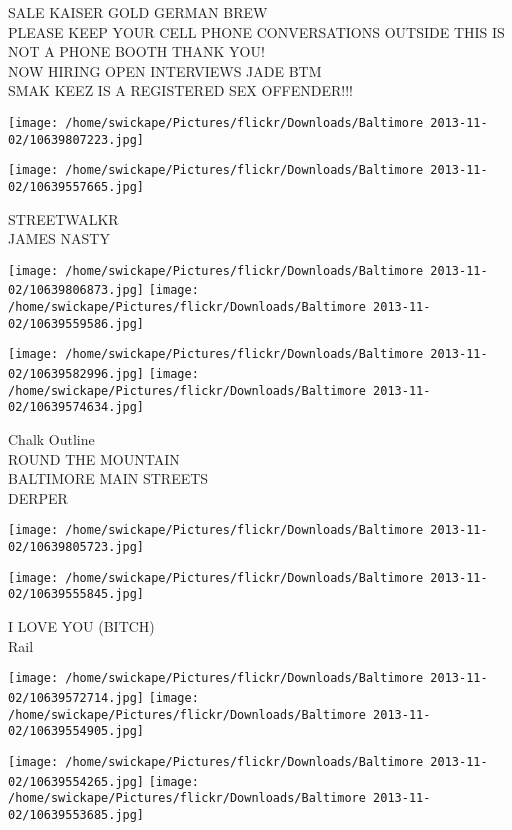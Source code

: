 \documentclass[10pt,letterpaper]{article}
\begin{document}
SALE KAISER GOLD GERMAN BREW\\
PLEASE KEEP YOUR CELL PHONE CONVERSATIONS OUTSIDE THIS IS NOT A PHONE BOOTH THANK YOU!\\
NOW HIRING OPEN INTERVIEWS JADE BTM\\
SMAK KEEZ IS A REGISTERED SEX OFFENDER!!!\\
\pagebreak

\texttt{[image: /home/swickape/Pictures/flickr/Downloads/Baltimore 2013-11-02/10639807223.jpg]}

\vspace{0.25in}
\texttt{[image: /home/swickape/Pictures/flickr/Downloads/Baltimore 2013-11-02/10639557665.jpg]}

STREETWALKR\\
JAMES NASTY\\
\pagebreak

\texttt{[image: /home/swickape/Pictures/flickr/Downloads/Baltimore 2013-11-02/10639806873.jpg]}
\texttt{[image: /home/swickape/Pictures/flickr/Downloads/Baltimore 2013-11-02/10639559586.jpg]}

\texttt{[image: /home/swickape/Pictures/flickr/Downloads/Baltimore 2013-11-02/10639582996.jpg]}
\texttt{[image: /home/swickape/Pictures/flickr/Downloads/Baltimore 2013-11-02/10639574634.jpg]}

Chalk Outline\\
ROUND THE MOUNTAIN\\
BALTIMORE MAIN STREETS\\
DERPER\\
\pagebreak

\texttt{[image: /home/swickape/Pictures/flickr/Downloads/Baltimore 2013-11-02/10639805723.jpg]}

\vspace{0.25in}
\texttt{[image: /home/swickape/Pictures/flickr/Downloads/Baltimore 2013-11-02/10639555845.jpg]}

I LOVE YOU (BITCH)\\
Rail\\
\pagebreak

\texttt{[image: /home/swickape/Pictures/flickr/Downloads/Baltimore 2013-11-02/10639572714.jpg]}
\texttt{[image: /home/swickape/Pictures/flickr/Downloads/Baltimore 2013-11-02/10639554905.jpg]}

\texttt{[image: /home/swickape/Pictures/flickr/Downloads/Baltimore 2013-11-02/10639554265.jpg]}
\texttt{[image: /home/swickape/Pictures/flickr/Downloads/Baltimore 2013-11-02/10639553685.jpg]}
\end{document}
